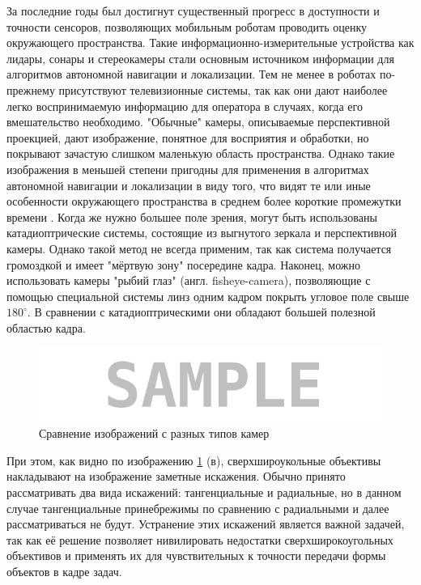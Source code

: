 За последние годы был достигнут существенный прогресс в доступности и точности сенсоров, позволяющих мобильным роботам 
проводить оценку окружающего пространства. Такие информационно-измерительные устройства как лидары, сонары и стереокамеры
 стали основным источником информации для алгоритмов автономной навигации и локализации. Тем не менее в роботах по-прежнему 
присутствуют телевизионные системы, так как они дают наиболее легко воспринимаемую информацию для оператора в случаях, когда 
его вмешательство необходимо. "Обычные" камеры, описываемые перспективной проекцией, дают изображение, понятное для 
восприятия и обработки, но покрывают зачастую слишком маленькую область пространства. Однако такие изображения в меньшей степени 
пригодны для применения в алгоритмах автономной навигации и локализации в виду того, что видят те или иные особенности окружающего
пространства в среднем более короткие промежутки времени \cite{stereo_slam}. Когда же нужно большее поле зрения, 
могут быть использованы катадиоптрические системы, состоящие из выгнутого зеркала и перспективной камеры. Однако такой метод 
не всегда применим, так как система получается громоздкой и имеет "мёртвую зону" посередине кадра. Наконец, можно использовать 
камеры "рыбий глаз" (англ. fisheye-camera), позволяющие с помощью специальной системы линз одним кадром покрыть угловое 
поле свыше $180^\circ$. В сравнении с катадиоптрическими они обладают большей полезной областью кадра. %

\begin{figure}[H]
	\begin{center}
		\includegraphics[scale=0.5]{pics/sample.png}
		\caption{Сравнение изображений с разных типов камер} 
		\label{pic:epipol} %
	\end{center}
\end{figure}

При этом, как видно по изображению \ref{pic:epipol} (в), сверхшироукольные объективы накладывают на изображение заметные искажения.
Обычно принято рассматривать два вида искажений: тангенциальные и радиальные, но в данном случае тангенциальные принебрежимы по сравнению
 с радиальными и далее рассматриваться не будут. Устранение этих искажений является важной задачей, так как её решение позволяет 
 нивилировать недостатки сверхширокоугольных объективов и применять их для чувствительных к точности передачи формы объектов в кадре задач.

